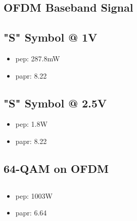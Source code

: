 \documentclass[a4paper]{article}
\begin{document}
\subsection{OFDM Baseband Signal}
\subsection*{"S" Symbol @ 1V}
\begin{itemize}
    \item \gls{pep}: 287.8mW
    \item \gls{papr}: 8.22
\end{itemize}

\subsection*{"S" Symbol @ 2.5V}
\begin{itemize}
    \item \gls{pep}: 1.8W
    \item \gls{papr}: 8.22
\end{itemize}

\subsection{64-QAM on OFDM}

\subsection*{}
\begin{itemize}
    \item \gls{pep}: 1003W
    \item \gls{papr}: 6.64
\end{itemize}
\end{document}
